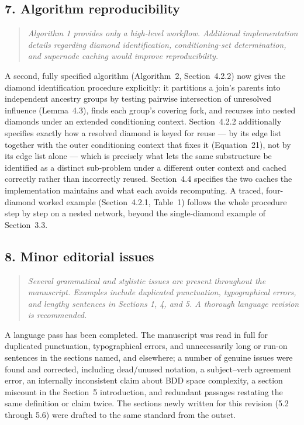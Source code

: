 \documentclass[11pt]{article}
\newenvironment{revcomment}
  {\begin{quote}\itshape\color{gray!60!black}}
  {\end{quote}}
\begin{document}
\subsection*{7. Algorithm reproducibility}
\begin{revcomment}
Algorithm 1 provides only a high-level workflow. Additional implementation details regarding diamond identification, conditioning-set determination, and supernode caching would improve reproducibility.
\end{revcomment}

A second, fully specified algorithm (Algorithm~2, Section~4.2.2) now gives the diamond identification procedure explicitly: it partitions a join's parents into independent ancestry groups by testing pairwise intersection of unresolved influence (Lemma~4.3), finds each group's covering fork, and recurses into nested diamonds under an extended conditioning context. Section~4.2.2 additionally specifies exactly how a resolved diamond is keyed for reuse --- by its edge list together with the outer conditioning context that fixes it (Equation~21), not by its edge list alone --- which is precisely what lets the same substructure be identified as a distinct sub-problem under a different outer context and cached correctly rather than incorrectly reused. Section~4.4 specifies the two caches the implementation maintains and what each avoids recomputing. A traced, four-diamond worked example (Section~4.2.1, Table~1) follows the whole procedure step by step on a nested network, beyond the single-diamond example of Section~3.3.

\subsection*{8. Minor editorial issues}
\begin{revcomment}
Several grammatical and stylistic issues are present throughout the manuscript. Examples include duplicated punctuation, typographical errors, and lengthy sentences in Sections 1, 4, and 5. A thorough language revision is recommended.
\end{revcomment}

A language pass has been completed. The manuscript was read in full for duplicated punctuation, typographical errors, and unnecessarily long or run-on sentences in the sections named, and elsewhere; a number of genuine issues were found and corrected, including dead/unused notation, a subject--verb agreement error, an internally inconsistent claim about BDD space complexity, a section miscount in the Section~5 introduction, and redundant passages restating the same definition or claim twice. The sections newly written for this revision (5.2 through 5.6) were drafted to the same standard from the outset.
\end{document}
